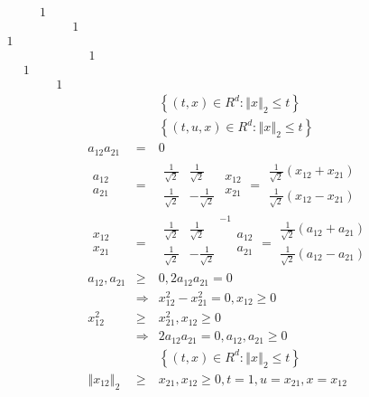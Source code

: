 \documentclass{article}
\begin{document}
$%
\begin{array}{cccccc}
&  & 1 &  &  &  \\ 
&  &  &  & 1 &  \\ 
1 &  &  &  &  &  \\ 
&  &  &  &  & 1 \\ 
& 1 &  &  &  &  \\ 
&  &  & 1 &  & 
\end{array}%
$%
\begin{eqnarray*}
&&\left\{ \left( t,x\right) \in R^{d}:\left\Vert x\right\Vert _{2}\leq
t\right\}  \\
&&\left\{ \left( t,u,x\right) \in R^{d}:\left\Vert x\right\Vert _{2}\leq
t\right\}  \\
a_{12}a_{21} &=&0 \\
\begin{array}{c}
a_{12} \\ 
a_{21}%
\end{array}
&=&%
\begin{array}{cc}
\frac{1}{\sqrt{2}} & \frac{1}{\sqrt{2}} \\ 
\frac{1}{\sqrt{2}} & -\frac{1}{\sqrt{2}}%
\end{array}%
\begin{array}{c}
x_{12} \\ 
x_{21}%
\end{array}%
=%
\begin{array}{c}
\frac{1}{\sqrt{2}}\left( x_{12}+x_{21}\right)  \\ 
\frac{1}{\sqrt{2}}\left( x_{12}-x_{21}\right) 
\end{array}
\\
\begin{array}{c}
x_{12} \\ 
x_{21}%
\end{array}
&=&%
\begin{array}{cc}
\frac{1}{\sqrt{2}} & \frac{1}{\sqrt{2}} \\ 
\frac{1}{\sqrt{2}} & -\frac{1}{\sqrt{2}}%
\end{array}%
^{-1}%
\begin{array}{c}
a_{12} \\ 
a_{21}%
\end{array}%
=%
\begin{array}{c}
\frac{1}{\sqrt{2}}\left( a_{12}+a_{21}\right)  \\ 
\frac{1}{\sqrt{2}}\left( a_{12}-a_{21}\right) 
\end{array}
\\
a_{12},a_{21} &\geq &0,2a_{12}a_{21}=0 \\
&\Longrightarrow &x_{12}^{2}-x_{21}^{2}=0,x_{12}\geq 0 \\
x_{12}^{2} &\geq &x_{21}^{2},x_{12}\geq 0 \\
&\Longrightarrow &2a_{12}a_{21}=0,a_{12},a_{21}\geq 0 \\
&&\left\{ \left( t,x\right) \in R^{d}:\left\Vert x\right\Vert _{2}\leq
t\right\}  \\
\left\Vert x_{12}\right\Vert _{2} &\geq &x_{21},x_{12}\geq
0,t=1,u=x_{21},x=x_{12}
\end{eqnarray*}%
\end{document}
